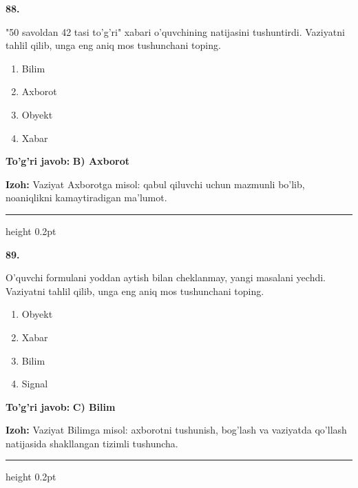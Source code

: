 \documentclass[10pt,a4paper,oneside]{article}
\begin{document}
\noindent\textbf{\color{ink}88.}
\par
"50 savoldan 42 tasi to'g'ri" xabari o'quvchining natijasini tushuntirdi. Vaziyatni tahlil qilib, unga eng aniq mos tushunchani toping.
\begin{enumerate}[label=\Alph*),leftmargin=9mm]
\item Bilim
\item Axborot
\item Obyekt
\item Xabar
\end{enumerate}
\begin{tcolorbox}[enhanced,breakable,colback=teal!4,colframe=teal!50!black,boxrule=0.5pt,arc=1.1mm,left=3mm,right=3mm,top=1.7mm,bottom=1.7mm,before skip=2mm,after skip=2mm]
\textbf{\color{teal}To'g'ri javob:} \textbf{B) Axborot}
\par\smallskip
\textbf{Izoh:} Vaziyat Axborotga misol: qabul qiluvchi uchun mazmunli bo'lib, noaniqlikni kamaytiradigan ma'lumot.
\end{tcolorbox}
\vspace{2mm}\hrule height 0.2pt \vspace{3mm}

\noindent\textbf{\color{ink}89.}
\par
O'quvchi formulani yoddan aytish bilan cheklanmay, yangi masalani yechdi. Vaziyatni tahlil qilib, unga eng aniq mos tushunchani toping.
\begin{enumerate}[label=\Alph*),leftmargin=9mm]
\item Obyekt
\item Xabar
\item Bilim
\item Signal
\end{enumerate}
\begin{tcolorbox}[enhanced,breakable,colback=teal!4,colframe=teal!50!black,boxrule=0.5pt,arc=1.1mm,left=3mm,right=3mm,top=1.7mm,bottom=1.7mm,before skip=2mm,after skip=2mm]
\textbf{\color{teal}To'g'ri javob:} \textbf{C) Bilim}
\par\smallskip
\textbf{Izoh:} Vaziyat Bilimga misol: axborotni tushunish, bog'lash va vaziyatda qo'llash natijasida shakllangan tizimli tushuncha.
\end{tcolorbox}
\vspace{2mm}\hrule height 0.2pt \vspace{3mm}
\end{document}
